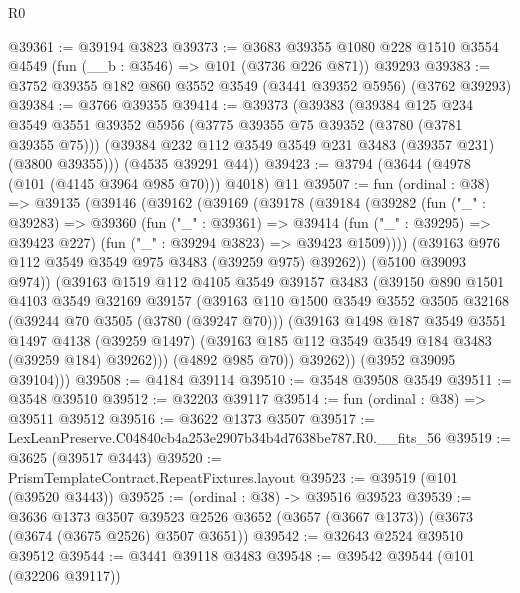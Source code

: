 \begin{lexlean}{R0}
\begin{coremodule}
@39361 := @39194 @3823
@39373 := @3683
    @39355
    @1080
    @228
    @1510
    @3554
    @4549
    (fun (__b : @3546) => @101 (@3736 @226 @871))
    @39293
@39383 := @3752 @39355 @182 @860 @3552 @3549 (@3441 @39352 @5956) (@3762 @39293)
@39384 := @3766 @39355
@39414 := @39373
    (@39383
      (@39384
        @125
        @234
        @3549
        @3551
        @39352
        @5956
        (@3775 @39355 @75 @39352 (@3780 (@3781 @39355 @75)))
        (@39384 @232 @112 @3549 @3549 @231 @3483 (@39357 @231) (@3800 @39355)))
      (@4535 @39291 @44))
@39423 := @3794 (@3644 (@4978 (@101 (@4145 @3964 @985 @70))) @4018) @11
@39507 := fun (ordinal : @38) =>
  @39135
    (@39146
      (@39162
        (@39169
          (@39178
            (@39184
              (@39282
                (fun ("_" : @39283) =>
                @39360
                  (fun ("_" : @39361) =>
                  @39414
                    (fun ("_" : @39295) => @39423 @227)
                    (fun ("_" : @39294 @3823) => @39423 @1509))))
              (@39163 @976 @112 @3549 @3549 @975 @3483 (@39259 @975) @39262))
            (@5100 @39093 @974))
          (@39163
            @1519
            @112
            @4105
            @3549
            @39157
            @3483
            (@39150
              @890
              @1501
              @4103
              @3549
              @32169
              @39157
              (@39163
                @110
                @1500
                @3549
                @3552
                @3505
                @32168
                (@39244 @70 @3505 (@3780 (@39247 @70)))
                (@39163
                  @1498
                  @187
                  @3549
                  @3551
                  @1497
                  @4138
                  (@39259 @1497)
                  (@39163 @185 @112 @3549 @3549 @184 @3483 (@39259 @184) @39262)))
              (@4892 @985 @70))
            @39262))
        (@3952 @39095 @39104)))
@39508 := @4184 @39114
@39510 := @3548 @39508 @3549
@39511 := @3548 @39510
@39512 := @32203 @39117
@39514 := fun (ordinal : @38) => @39511 @39512
@39516 := @3622 @1373 @3507
@39517 := LexLeanPreserve.C04840cb4a253e2907b34b4d7638be787.R0.__fits_56
@39519 := @3625 (@39517 @3443)
@39520 := PrismTemplateContract.RepeatFixtures.layout
@39523 := @39519 (@101 (@39520 @3443))
@39525 := (ordinal : @38) -> @39516 @39523
@39539 := @3636
    @1373
    @3507
    @39523
    @2526
    @3652
    (@3657 (@3667 @1373))
    (@3673 (@3674 (@3675 @2526) @3507 @3651))
@39542 := @32643 @2524 @39510 @39512
@39544 := @3441 @39118 @3483
@39548 := @39542 @39544 (@101 (@32206 @39117))

\end{coremodule}
\end{lexlean}
